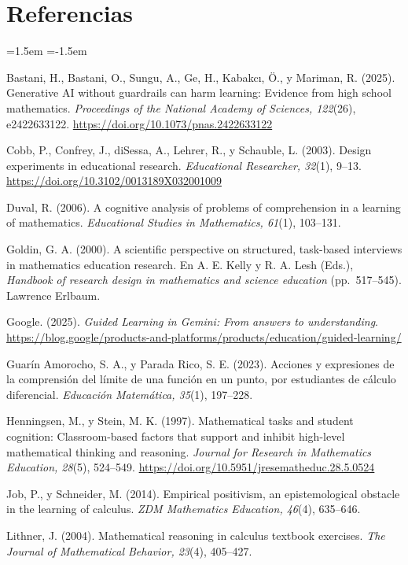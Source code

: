 \documentclass[11pt,letterpaper]{article}
\begin{document}
\section*{Referencias}
\begin{list}{}{\leftmargin=1.5em \itemindent=-1.5em \itemsep=3pt \parsep=0pt}\small
\item Bastani, H., Bastani, O., Sungu, A., Ge, H., Kabakcı, Ö., y Mariman, R. (2025). Generative AI without guardrails can harm learning: Evidence from high school mathematics. \emph{Proceedings of the National Academy of Sciences, 122}(26), e2422633122. \url{https://doi.org/10.1073/pnas.2422633122}
\item Cobb, P., Confrey, J., diSessa, A., Lehrer, R., y Schauble, L. (2003). Design experiments in educational research. \emph{Educational Researcher, 32}(1), 9--13. \url{https://doi.org/10.3102/0013189X032001009}
\item Duval, R. (2006). A cognitive analysis of problems of comprehension in a learning of mathematics. \emph{Educational Studies in Mathematics, 61}(1), 103--131.
\item Goldin, G. A. (2000). A scientific perspective on structured, task-based interviews in mathematics education research. En A. E. Kelly y R. A. Lesh (Eds.), \emph{Handbook of research design in mathematics and science education} (pp.~517--545). Lawrence Erlbaum.
\item Google. (2025). \emph{Guided Learning in Gemini: From answers to understanding}. \url{https://blog.google/products-and-platforms/products/education/guided-learning/}
\item Guarín Amorocho, S. A., y Parada Rico, S. E. (2023). Acciones y expresiones de la comprensión del límite de una función en un punto, por estudiantes de cálculo diferencial. \emph{Educación Matemática, 35}(1), 197--228.
\item Henningsen, M., y Stein, M. K. (1997). Mathematical tasks and student cognition: Classroom-based factors that support and inhibit high-level mathematical thinking and reasoning. \emph{Journal for Research in Mathematics Education, 28}(5), 524--549. \url{https://doi.org/10.5951/jresematheduc.28.5.0524}
\item Job, P., y Schneider, M. (2014). Empirical positivism, an epistemological obstacle in the learning of calculus. \emph{ZDM Mathematics Education, 46}(4), 635--646.
\item Lithner, J. (2004). Mathematical reasoning in calculus textbook exercises. \emph{The Journal of Mathematical Behavior, 23}(4), 405--427.

\end{list}
\end{document}
